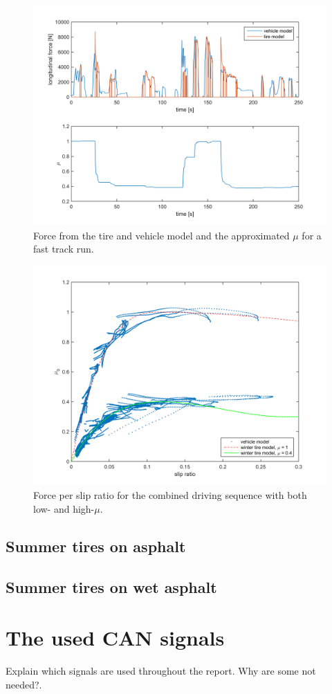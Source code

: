 \begin{figure}[h]
	\centering
	\includegraphics[width=1.0\textwidth]{Pictures/force_mue_comb2}
	\caption {Force from the tire and vehicle model and the approximated $ \mu $ for a fast track run.}
	\label{force_mue_comb2}
\end{figure}

\begin{figure}[h]
	\centering
	\includegraphics[width=1.0\textwidth]{Pictures/slip_kraft_comb2}
	\caption {Force per slip ratio for the combined driving sequence with both low- and high-$ \mu $.}
	\label{slip_kraft_comb2}
\end{figure}

\subsection{Summer tires on asphalt}

\subsection{Summer tires on wet asphalt}

\section{The used CAN signals}
Explain which signals are used throughout the report. Why are some not needed?.
